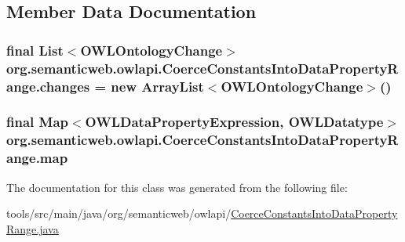 \subsection{Member Data Documentation}
\hypertarget{classorg_1_1semanticweb_1_1owlapi_1_1_coerce_constants_into_data_property_range_a8a747a2a71841a9228dac783962d8792}{
\subsubsection[{changes}]{\setlength{\rightskip}{0pt plus 5cm}final List$<${\bf O\-W\-L\-Ontology\-Change}$>$ org.\-semanticweb.\-owlapi.\-Coerce\-Constants\-Into\-Data\-Property\-Range.\-changes = new Array\-List$<${\bf O\-W\-L\-Ontology\-Change}$>$()\hspace{0.3cm}{\ttfamily [private]}}}\label{classorg_1_1semanticweb_1_1owlapi_1_1_coerce_constants_into_data_property_range_a8a747a2a71841a9228dac783962d8792}
\hypertarget{classorg_1_1semanticweb_1_1owlapi_1_1_coerce_constants_into_data_property_range_a16fb74cc1eb905ccdc03c9199402f3f1}{
\subsubsection[{map}]{\setlength{\rightskip}{0pt plus 5cm}final Map$<${\bf O\-W\-L\-Data\-Property\-Expression}, {\bf O\-W\-L\-Datatype}$>$ org.\-semanticweb.\-owlapi.\-Coerce\-Constants\-Into\-Data\-Property\-Range.\-map\hspace{0.3cm}{\ttfamily [protected]}}}\label{classorg_1_1semanticweb_1_1owlapi_1_1_coerce_constants_into_data_property_range_a16fb74cc1eb905ccdc03c9199402f3f1}


The documentation for this class was generated from the following file\-:\begin{DoxyCompactItemize}
\item 
tools/src/main/java/org/semanticweb/owlapi/\hyperlink{_coerce_constants_into_data_property_range_8java}{Coerce\-Constants\-Into\-Data\-Property\-Range.\-java}\end{DoxyCompactItemize}
